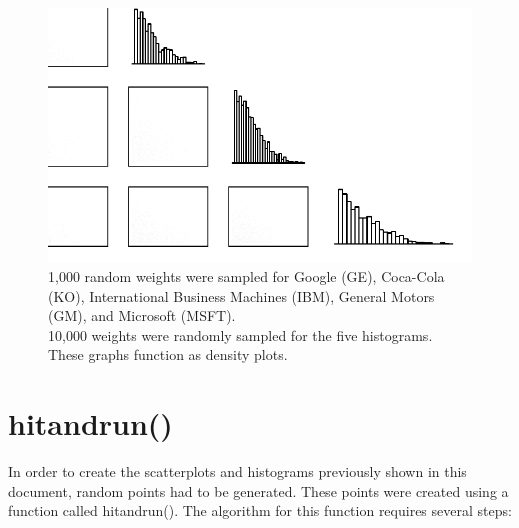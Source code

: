 \documentclass{article}\usepackage{graphicx, color}
\makeatletter
\def\maxwidth{ %
  \ifdim\Gin@nat@width>\linewidth
    \linewidth
  \else
    \Gin@nat@width
  \fi
}
\newenvironment{knitrout}{}{} %
\makeatother
\begin{document}
\begin{figure}[H]
\begin{knitrout}
\color{fgcolor}
\includegraphics[width=\maxwidth]{figure/fiveByFiveGrid} 

\end{knitrout}

\caption{1,000 random weights were sampled for Google (GE), Coca-Cola (KO), International Business Machines (IBM), General Motors (GM), and Microsoft (MSFT).
\\
10,000 weights were randomly sampled for the five histograms. These graphs function as density plots.}
\end{figure}

\section*{hitandrun()}

In order to create the scatterplots and histograms previously shown in this document, random points had to be generated. These points were created using a function called hitandrun(). The algorithm for this function requires several steps:
\end{document}
